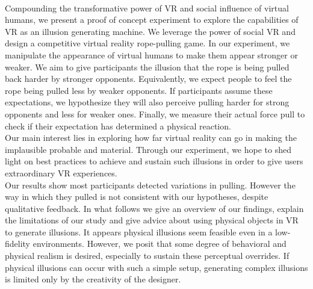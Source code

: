 \\
Compounding the transformative power of VR and social influence of virtual humans, we present a proof of concept experiment to explore the capabilities of VR as an illusion generating machine. We leverage the power of social VR and design a competitive virtual reality rope-pulling game. In our experiment, we manipulate the appearance of virtual humans to make them appear stronger or weaker.  We aim to give participants the illusion that the rope is being pulled back harder by stronger opponents. Equivalently, we expect people to feel the rope being pulled less by weaker opponents.  If participants assume these expectations, we hypothesize they will also perceive pulling harder for strong opponents and less for weaker ones. Finally, we measure their actual force pull to check if their expectation has determined a physical reaction. \\
Our main interest lies in exploring how far virtual reality can go in making the implausible probable and material.  Through our experiment, we hope to shed light on best practices to achieve and sustain such illusions in order to give users extraordinary VR experiences. 
\\
Our results show most participants detected variations in pulling. However the way in which they pulled is not consistent with our hypotheses, despite qualitative feedback. In what follows we give an overview of our findings, explain the limitations of our study and give advice about using physical objects in VR to generate illusions. It appears physical illusions seem feasible even in a low-fidelity environments. However, we posit that some degree of behavioral and physical realism is desired, especially to sustain these perceptual overrides. If physical illusions can occur with such a simple setup, generating complex illusions is limited only by the creativity of the designer.